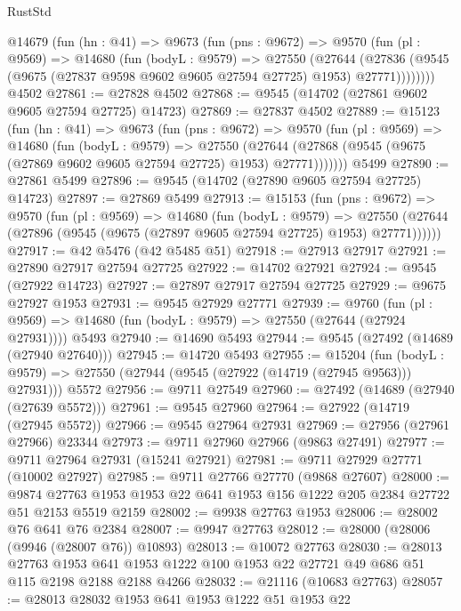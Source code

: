 \begin{lexlean}{RustStd}
\begin{coremodule}
    @14679
      (fun (hn : @41) =>
      @9673
        (fun (pns : @9672) =>
        @9570
          (fun (pl : @9569) =>
          @14680
            (fun (bodyL : @9579) =>
            @27550
              (@27644
                (@27836 (@9545 (@9675 (@27837 @9598 @9602 @9605 @27594 @27725) @1953) @27771))))))))
    @4502
@27861 := @27828 @4502
@27868 := @9545 (@14702 (@27861 @9602 @9605 @27594 @27725) @14723)
@27869 := @27837 @4502
@27889 := @15123
    (fun (hn : @41) =>
    @9673
      (fun (pns : @9672) =>
      @9570
        (fun (pl : @9569) =>
        @14680
          (fun (bodyL : @9579) =>
          @27550
            (@27644 (@27868 (@9545 (@9675 (@27869 @9602 @9605 @27594 @27725) @1953) @27771)))))))
    @5499
@27890 := @27861 @5499
@27896 := @9545 (@14702 (@27890 @9605 @27594 @27725) @14723)
@27897 := @27869 @5499
@27913 := @15153
    (fun (pns : @9672) =>
    @9570
      (fun (pl : @9569) =>
      @14680
        (fun (bodyL : @9579) =>
        @27550 (@27644 (@27896 (@9545 (@9675 (@27897 @9605 @27594 @27725) @1953) @27771))))))
@27917 := @42 @5476 (@42 @5485 @51)
@27918 := @27913 @27917
@27921 := @27890 @27917 @27594 @27725
@27922 := @14702 @27921
@27924 := @9545 (@27922 @14723)
@27927 := @27897 @27917 @27594 @27725
@27929 := @9675 @27927 @1953
@27931 := @9545 @27929 @27771
@27939 := @9760
    (fun (pl : @9569) => @14680 (fun (bodyL : @9579) => @27550 (@27644 (@27924 @27931))))
    @5493
@27940 := @14690 @5493
@27944 := @9545 (@27492 (@14689 (@27940 @27640)))
@27945 := @14720 @5493
@27955 := @15204
    (fun (bodyL : @9579) => @27550 (@27944 (@9545 (@27922 (@14719 (@27945 @9563))) @27931)))
    @5572
@27956 := @9711 @27549
@27960 := @27492 (@14689 (@27940 (@27639 @5572)))
@27961 := @9545 @27960
@27964 := @27922 (@14719 (@27945 @5572))
@27966 := @9545 @27964 @27931
@27969 := @27956 (@27961 @27966) @23344
@27973 := @9711 @27960 @27966 (@9863 @27491)
@27977 := @9711 @27964 @27931 (@15241 @27921)
@27981 := @9711 @27929 @27771 (@10002 @27927)
@27985 := @9711 @27766 @27770 (@9868 @27607)
@28000 := @9874 @27763 @1953 @1953 @22 @641 @1953 @156 @1222 @205 @2384 @27722 @51 @2153 @5519 @2159
@28002 := @9938 @27763 @1953
@28006 := @28002 @76 @641 @76 @2384
@28007 := @9947 @27763
@28012 := @28000 (@28006 (@9946 (@28007 @76)) @10893)
@28013 := @10072 @27763
@28030 := @28013
    @27763
    @1953
    @641
    @1953
    @1222
    @100
    @1953
    @22
    @27721
    @49
    @686
    @51
    @115
    @2198
    @2188
    @2188
    @4266
@28032 := @21116 (@10683 @27763)
@28057 := @28013
    @28032
    @1953
    @641
    @1953
    @1222
    @51
    @1953
    @22

\end{coremodule}
\end{lexlean}
